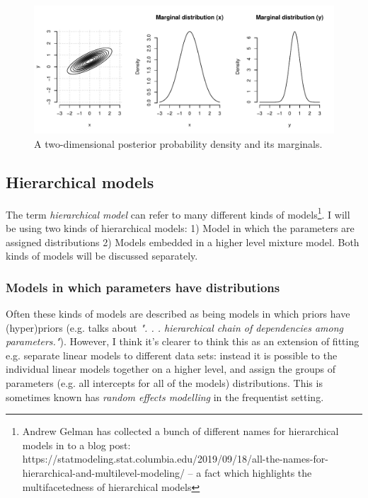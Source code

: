 \documentclass{article}\usepackage{knitr}
\begin{document}
\begin{figure}
\centering
\begin{knitrout}
\color{fgcolor}
\includegraphics[width=\maxwidth]{figure/unnamed-chunk-13-1} 

\end{knitrout}
\caption{A two-dimensional posterior probability density and its marginals. }
\label{fig:marginals}
\end{figure}

\subsection{Hierarchical models}
\label{sec:hierarchical_models}

The term \textit{hierarchical model} can refer to many different kinds of models\footnote{Andrew Gelman has collected a bunch of different names for hierarchical models in to a blog post: https://statmodeling.stat.columbia.edu/2019/09/18/all-the-names-for-hierarchical-and-multilevel-modeling/ -- a fact which highlights the multifacetedness of hierarchical models}. I will be using two kinds of hierarchical models: 1) Model in which the parameters are assigned distributions 2) Models embedded in a higher level mixture model. Both kinds of models will be discussed separately.

\subsubsection*{Models in which parameters have distributions}

Often these kinds of models are described as being models in which priors have (hyper)priors (e.g. \citet[p. 225]{kruschke2015} talks about \textit{". . . hierarchical chain of dependencies among parameters."}). However, I think it's clearer to think this as an extension of fitting e.g. separate linear models to different data sets: instead it is possible to the individual linear models together on a higher level, and assign the groups of parameters (e.g. all intercepts for all of the models) distributions. This is sometimes known has \textit{random effects modelling} in the frequentist setting.
\end{document}
